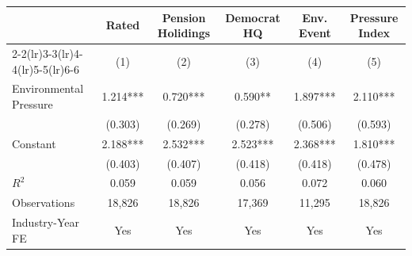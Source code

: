 {
\def\sym#1{\ifmmode^{#1}\else\(^{#1}\)\fi}
\begin{tabular}{l*{5}{c}}
\toprule
                    &\multicolumn{1}{c}{Rated}&\multicolumn{1}{c}{Pension Holidings}&\multicolumn{1}{c}{Democrat HQ}&\multicolumn{1}{c}{Env. Event}&\multicolumn{1}{c}{Pressure Index}\\\cmidrule(lr){2-2}\cmidrule(lr){3-3}\cmidrule(lr){4-4}\cmidrule(lr){5-5}\cmidrule(lr){6-6}
                    &\multicolumn{1}{c}{(1)}   &\multicolumn{1}{c}{(2)}   &\multicolumn{1}{c}{(3)}   &\multicolumn{1}{c}{(4)}   &\multicolumn{1}{c}{(5)}   \\
\midrule
Environmental Pressure&       1.214***&       0.720***&       0.590** &       1.897***&       2.110***\\
                    &     (0.303)   &     (0.269)   &     (0.278)   &     (0.506)   &     (0.593)   \\
\addlinespace
Constant            &       2.188***&       2.532***&       2.523***&       2.368***&       1.810***\\
                    &     (0.403)   &     (0.407)   &     (0.418)   &     (0.418)   &     (0.478)   \\
\midrule
\(R^{2}\)           &       0.059   &       0.059   &       0.056   &       0.072   &       0.060   \\
Observations        &      18,826   &      18,826   &      17,369   &      11,295   &      18,826   \\
Industry-Year FE    &         Yes   &         Yes   &         Yes   &         Yes   &         Yes   \\
\bottomrule
\end{tabular}
}
